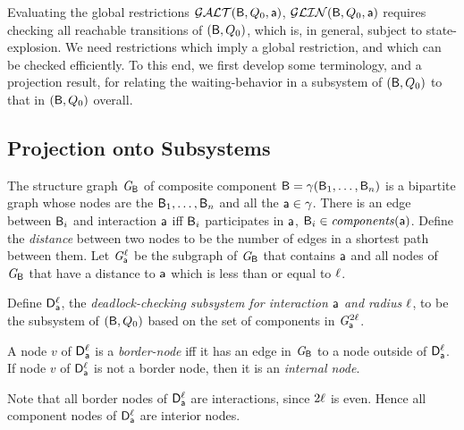 
   \label{s:local.preamble}
%   

Evaluating the global restrictions $\mathcal{GALT}(\mathsf{B},Q_0,\mathsf{a})$, $\mathcal{GLIN}(\mathsf{B},Q_0,\mathsf{a})$ requires checking all reachable transitions of
$(\mathsf{B}, Q_0)$, which is, in general, subject to state-explosion.
We need restrictions which imply a global restriction, 
and which can be checked efficiently.
%
To this end, we first develop some terminology, and a projection result, for relating the waiting-behavior in a
subsystem of $(\mathsf{B},Q_0)$ to that in $(\mathsf{B},Q_0)$ overall.



\subsection{Projection onto Subsystems}
\label{s:projection}

\begin{definition} \label{def:structure-graph} The structure
graph $\mathit{G}_{\mathsf{B}}$ of composite component $\mathsf{B} = \gamma(\mathsf{B}_1,\dots,\mathsf{B}_n)$ is a
bipartite graph whose nodes are the $\mathsf{B}_1, \ldots, \mathsf{B}_n$ and all the
$\mathsf{a} \in \gamma$.  There is an edge between $\mathsf{B}_i$ and
interaction $\mathsf{a}$ iff $\mathsf{B}_i$ participates in $\mathsf{a}$, \ie $\mathsf{B}_i \in \mathit{components}(\mathsf{a})$.  Define the
\emph{distance} between two nodes to be the number of edges in a shortest path
between them.  Let $\mathit{G}_{\mathsf{a}}^{\ell}$ be the subgraph
of $\mathit{G}_{\mathsf{B}}$ that contains $\mathsf{a}$ and all nodes of $\mathit{G}_{\mathsf{B}}$
that have a distance to $\mathsf{a}$ which is less than or equal to $\ell$.
\end{definition}


\begin{definition} \label{def:dsk}
Define $\mathsf{D}_{\mathsf{a}}^{\ell}$, the \emph{deadlock-checking subsystem for interaction $\mathsf{a}$ and
radius $\ell$}, to be the subsystem of $(\mathsf{B}, Q_0)$ based on the set of %
components in $\mathit{G}_{\mathsf{a}}^{2\ell}$.  %
\end{definition}

\begin{definition}  \label{def:dsk.border-and internal}
A node $v$ of $\mathsf{D}_{\mathsf{a}}^{\ell}$ is a \emph{border-node} iff it has an
edge in $\mathit{G}_{\mathsf{B}}$ to a node outside of $\mathsf{D}_{\mathsf{a}}^{\ell}$.
If node $v$ of $\mathsf{D}_{\mathsf{a}}^{\ell}$ is not a border node, then it is an \emph{internal node}.
\end{definition}
Note that all border nodes of  $\mathsf{D}_{\mathsf{a}}^{\ell}$ are interactions,
since $2\ell$ is even. Hence all component nodes of $\mathsf{D}_{\mathsf{a}}^{\ell}$ are
interior nodes.


